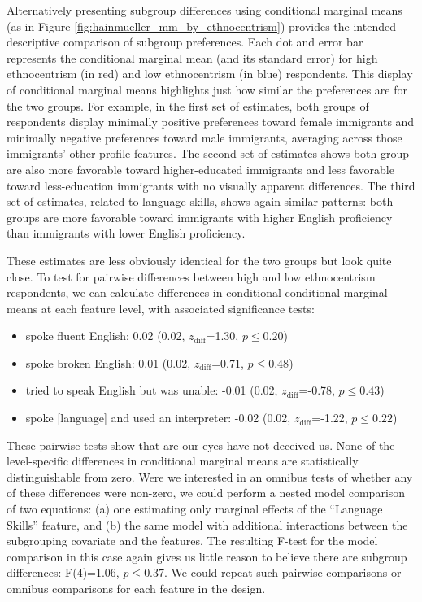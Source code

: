 \documentclass[a4paper,12pt]{article}\usepackage[]{graphicx}\usepackage[]{color}
\begin{document}
Alternatively presenting subgroup differences using conditional marginal means (as in Figure \ref{fig:hainmueller_mm_by_ethnocentrism}) provides the intended descriptive comparison of subgroup preferences. Each dot and error bar represents the conditional marginal mean (and its standard error) for high ethnocentrism (in red) and low ethnocentrism (in blue) respondents. This display of conditional marginal means highlights just how similar the preferences are for the two groups. For example, in the first set of estimates, both groups of respondents display minimally positive preferences toward female immigrants and minimally negative preferences toward male immigrants, averaging across those immigrants' other profile features. The second set of estimates shows both group are also more favorable toward higher-educated immigrants and less favorable toward less-education immigrants with no visually apparent differences. The third set of estimates, related to language skills, shows again similar patterns: both groups are more favorable toward immigrants with higher English proficiency than immigrants with lower English proficiency.

These estimates are less obviously identical for the two groups but look quite close. To test for pairwise differences between high and low ethnocentrism respondents, we can calculate differences in conditional conditional marginal means at each feature level, with associated significance tests:

\begin{itemize}
\item spoke fluent English: 0.02 (0.02, $z_{\text{diff}}$=1.30, $p\leq 0.20$)
\item spoke broken English: 0.01 (0.02, $z_{\text{diff}}$=0.71, $p\leq 0.48$)
\item tried to speak English but was unable: -0.01 (0.02, $z_{\text{diff}}$=-0.78, $p\leq 0.43$)
\item spoke [language] and used an interpreter: -0.02 (0.02, $z_{\text{diff}}$=-1.22, $p\leq 0.22$)

\end{itemize}



\noindent These pairwise tests show that are our eyes have not deceived us. None of the level-specific differences in conditional marginal means are statistically distinguishable from zero. Were we interested in an omnibus tests of whether any of these differences were non-zero, we could perform a nested model comparison of two equations: (a) one estimating only marginal effects of the ``Language Skills'' feature, and (b) the same model with additional interactions between the subgrouping covariate and the features. The resulting F-test for the model comparison in this case again gives us little reason to believe there are subgroup differences: F(4)=1.06, $p\leq0.37$. We could repeat such pairwise comparisons or omnibus comparisons for each feature in the design.
\end{document}
